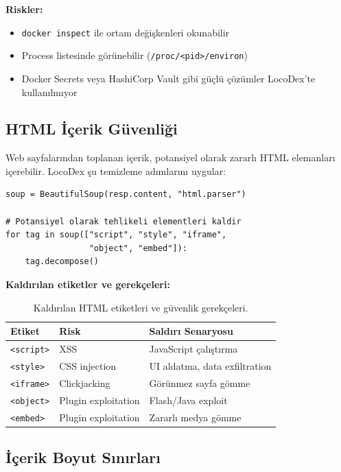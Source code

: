 \textbf{Riskler:}
\begin{itemize}
  \item \texttt{docker inspect} ile ortam de\u{g}i\c{s}kenleri okunabilir
  \item Process listesinde g\"{o}r\"{u}nebilir (\texttt{/proc/<pid>/environ})
  \item Docker Secrets veya HashiCorp Vault gibi g\"{u}\c{c}l\"{u} \c{c}\"{o}z\"{u}mler LocoDex'te kullan{\i}lm{\i}yor
\end{itemize}

\subsection{HTML \.{I}\c{c}erik G\"{u}venli\u{g}i}

Web sayfalar{\i}ndan toplanan i\c{c}erik, potansiyel olarak zararl{\i} HTML elemanlar{\i} i\c{c}erebilir. LocoDex \c{s}u temizleme ad{\i}mlar{\i}n{\i} uygular:

\begin{verbatim}
soup = BeautifulSoup(resp.content, "html.parser")

# Potansiyel olarak tehlikeli elementleri kaldir
for tag in soup(["script", "style", "iframe",
                 "object", "embed"]):
    tag.decompose()
\end{verbatim}

\textbf{Kald{\i}r{\i}lan etiketler ve gerek\c{c}eleri:}

\begin{table}[H]
\centering
\caption{Kald{\i}r{\i}lan HTML etiketleri ve g\"{u}venlik gerek\c{c}eleri.}
\label{tab:html-sanitization}
\begin{tabular}{lll}
\toprule
\textbf{Etiket} & \textbf{Risk} & \textbf{Sald{\i}r{\i} Senaryosu} \\
\midrule
\texttt{<script>} & XSS & JavaScript \c{c}al{\i}\c{s}t{\i}rma \\
\texttt{<style>} & CSS injection & UI aldatma, data exfiltration \\
\texttt{<iframe>} & Clickjacking & G\"{o}r\"{u}nmez sayfa g\"{o}mme \\
\texttt{<object>} & Plugin exploitation & Flash/Java exploit \\
\texttt{<embed>} & Plugin exploitation & Zararl{\i} medya g\"{o}mme \\
\bottomrule
\end{tabular}
\end{table}

\subsection{\.{I}\c{c}erik Boyut S{\i}n{\i}rlar{\i}}

